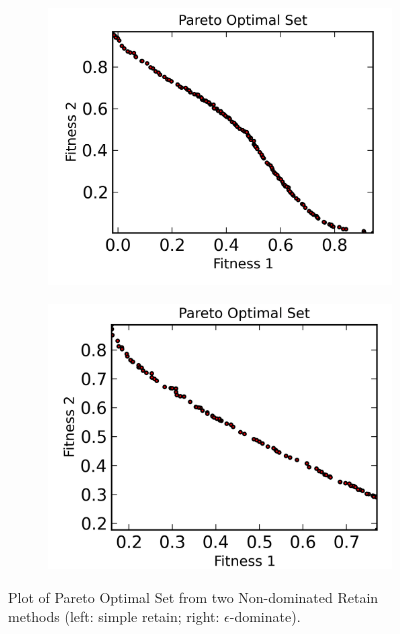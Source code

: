 \documentclass[12pt, runningheads,a4paper]{llncs}
\begin{document}
\begin{figure}
        \centering
        \begin{subfigure}[b]{0.4\textwidth}
                \centering
                \includegraphics[width=\textwidth]{./figs/simpleretain.png}
        \end{subfigure}
        \begin{subfigure}[b]{0.4\textwidth}
                \centering
                \includegraphics[width=\textwidth]{./figs/edominance.png}
        \end{subfigure}
        \caption{Plot of Pareto Optimal Set from two Non-dominated Retain methods (left: simple retain; right: $\epsilon$-dominate).}\label{fig:retain}
\end{figure}
\end{document}
